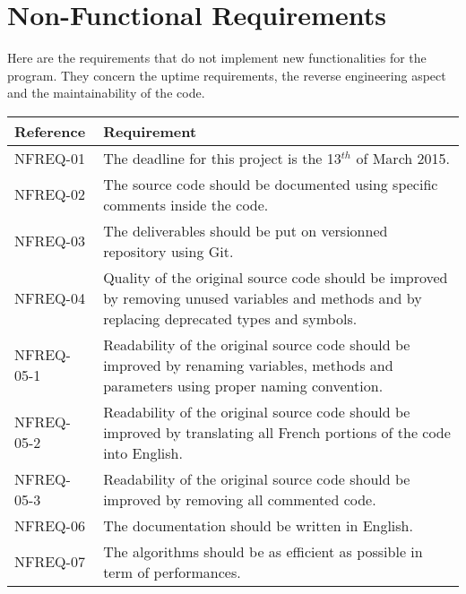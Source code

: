 \section{Non-Functional Requirements}
Here are the requirements that do not implement new functionalities for the program. They concern the uptime requirements, the reverse engineering aspect and the maintainability of the code.
\begin{flushleft}
    \begin{tabular}{ | p{} |  p{} |}
    \hline
   	\textbf{Reference} & \textbf{Requirement}
    \\
    \hline
	NFREQ-01 & The deadline for this project is the 13$^{th}$ of March 2015.
    \\
    \hline
	NFREQ-02 & The source code should be documented using specific comments inside the code.
    \\
    \hline
    NFREQ-03 & The deliverables should be put on versionned repository using Git.
    \\
    \hline
    NFREQ-04 & Quality of the original source code should be improved by removing unused variables and methods and by replacing deprecated types and symbols.
    \\
    \hline
    NFREQ-05-1 & Readability of the original source code should be improved by renaming variables, methods and parameters using proper naming convention.
    \\
    \hline
    NFREQ-05-2 & Readability of the original source code should be improved by translating all French portions of the code into English.
    \\
    \hline
    NFREQ-05-3 & Readability of the original source code should be improved by removing all commented code.
    \\
    \hline
    NFREQ-06 & The documentation should be written in English.
    \\
    \hline
    NFREQ-07 & The algorithms should be as efficient as possible in term of performances.
    \\
    \hline
    \end{tabular}
\end{flushleft}
